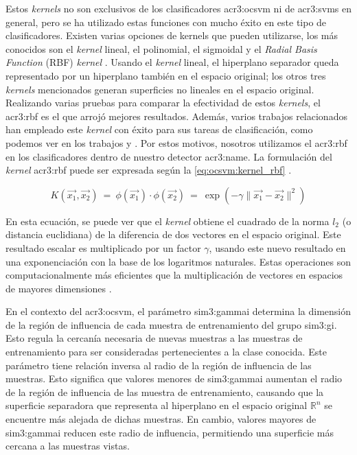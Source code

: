 Estos \textit{kernels} no son exclusivos de los clasificadores
\gls{acr3:ocsvm} ni de \gls{acr3:svm}s en general, pero se ha utilizado
estas funciones con mucho éxito en este tipo de clasificadores.
Existen varias opciones de kernels que pueden utilizarse, los más
conocidos son el \textit{kernel} lineal, el polinomial, el sigmoidal
y el \textit{Radial Basis Function} (RBF) \textit{kernel}
\citep{rieck2009machine}. %
Usando el \textit{kernel} lineal, el hiperplano separador queda
representado por un hiperplano también en el espacio original; los
otros tres \textit{kernels} mencionados generan superficies no lineales
en el espacio original.
Realizando varias pruebas para comparar la efectividad de estos \textit{kernels},
el \gls{acr3:rbf} es el que arrojó mejores resultados. Además, varios trabajos
relacionados han empleado este \textit{kernel} con éxito para sus tareas
de clasificación, como podemos ver en los trabajos \citep{parhizkar2015oc}
y \citep{perdisci2006using}. Por estos motivos, nosotros utilizamos el
\gls{acr3:rbf} en los clasificadores dentro de nuestro detector
\gls{acr3:name}.
La formulación del \textit{kernel} \gls{acr3:rbf} puede ser expresada
según la \autoref{eq:ocsvm:kernel_rbf}
\citep{parhizkar2015oc}. %

\begin{equation}
    \label{eq:ocsvm:kernel_rbf}
    K(\vec{x_{1}}, \vec{x_{2}})
    \ = \
    \phi(\vec{x_{1}}) \cdot \phi(\vec{x_{2}})
    \ = \
    \exp(
        - \gamma \lVert \vec{x_{1}} - \vec{x_{2}} \lVert^2
    )
\end{equation}

En esta ecuación, se puede ver que el \textit{kernel} obtiene el cuadrado
de la norma $l_{2}$ (o distancia euclidiana) de la diferencia de dos
vectores en el espacio original. Este resultado escalar es multiplicado
por un factor $\gamma$, usando este nuevo resultado en una exponenciación
con la base de los logaritmos naturales.
Estas operaciones son computacionalmente más eficientes que la
multiplicación de vectores en espacios de mayores dimensiones
\citep{rieck2009machine}. %

En el contexto del \gls{acr3:ocsvm}, el parámetro \gls{sim3:gammai}
determina la dimensión de la región de influencia de cada muestra de
entrenamiento del grupo \gls{sim3:gi}. Esto regula la cercanía necesaria
de nuevas muestras a las muestras de entrenamiento para ser consideradas
pertenecientes a la clase conocida. Este parámetro tiene relación inversa
al radio de la región de influencia de las muestras.
Esto significa que valores menores de \gls{sim3:gammai} aumentan el radio
de la región de influencia de las muestra de entrenamiento, causando que
la superficie separadora que representa al hiperplano en el espacio original
$\mathbb{R}^{n}$ se encuentre más alejada de dichas muestras. En cambio,
valores mayores de \gls{sim3:gammai} reducen este radio de influencia,
permitiendo una superficie más cercana a las muestras vistas.

